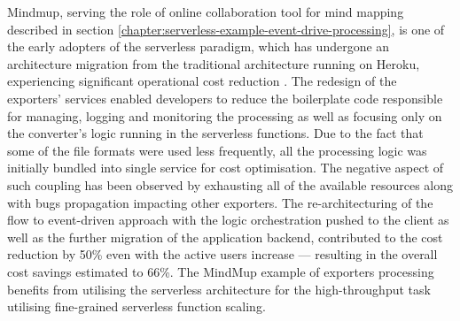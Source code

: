Mindmup, serving the role of online collaboration tool for mind mapping described in section \ref{chapter:serverless-example-event-drive-processing}, is one of the early adopters of the serverless paradigm, which has undergone an architecture migration from the traditional architecture running on Heroku, experiencing significant operational cost reduction \cite{ServerlessComputingEconomicAndArchitecturalImpact}.
The redesign of the exporters' services enabled developers to reduce the boilerplate code responsible for managing, logging and monitoring the processing as well as focusing only on the converter's logic running in the serverless functions.
Due to the fact that some of the file formats were used less frequently, all the processing logic was initially bundled into single service for cost optimisation. The negative aspect of such coupling has been observed by exhausting all of the available resources along with bugs propagation impacting other exporters.
The re-architecturing of the flow to event-driven approach with the logic orchestration pushed to the client as well as the further migration of the application backend, contributed to the cost reduction by 50\% even with the active users increase --- resulting in the overall cost savings estimated to 66\%.
The MindMup example of exporters processing benefits from utilising the serverless architecture for the high-throughput task utilising fine-grained serverless function scaling.





